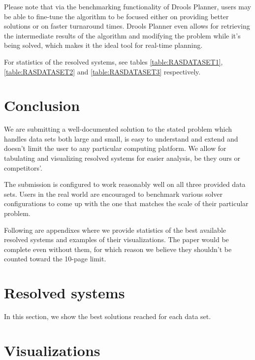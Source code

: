\documentclass[10pt,a4paper,final]{article}
\begin{document}
Please note that via the benchmarking functionality of Drools Planner, users may be able to fine-tune the algorithm to be focused either on providing better solutions or on faster turnaround times. Drools Planner even allows for retrieving the intermediate results of the algorithm and modifying the problem while it's being solved, which makes it the ideal tool for real-time planning.

For statistics of the resolved systems, see tables \ref{table:RASDATASET1}, \ref{table:RASDATASET2} and \ref{table:RASDATASET3} respectively. 

\section{Conclusion}

We are submitting a well-documented solution to the stated problem which handles data sets both large and small, is easy to understand and extend and doesn't limit the user to any particular computing platform. We allow for tabulating and visualizing resolved systems for easier analysis, be they ours or competitors'.

The submission is configured to work reasonably well on all three provided data sets. Users in the real world are encouraged to benchmark various solver configurations to come up with the one that matches the scale of their particular problem.

\appendix

Following are appendixes where we provide statistics of the best available resolved systems and examples of their visualizations. The paper would be complete even without them, for which reason we believe they shouldn't be counted toward the 10-page limit.

\section{Resolved systems}

In this section, we show the best solutions reached for each data set. 





\section{Visualizations}
\end{document}
